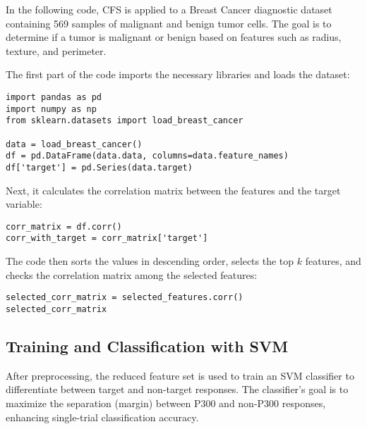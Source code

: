 \documentclass{article}
\begin{document}
In the following code, CFS is applied to a Breast Cancer diagnostic dataset containing 569 samples of malignant and benign tumor cells. The goal is to determine if a tumor is malignant or benign based on features such as radius, texture, and perimeter.

The first part of the code imports the necessary libraries and loads the dataset:
\begin{verbatim}
import pandas as pd
import numpy as np
from sklearn.datasets import load_breast_cancer

data = load_breast_cancer()
df = pd.DataFrame(data.data, columns=data.feature_names)
df['target'] = pd.Series(data.target)
\end{verbatim}

Next, it calculates the correlation matrix between the features and the target variable:
\begin{verbatim}
corr_matrix = df.corr()
corr_with_target = corr_matrix['target']
\end{verbatim}

The code then sorts the values in descending order, selects the top \( k \) features, and checks the correlation matrix among the selected features:
\begin{verbatim}
selected_corr_matrix = selected_features.corr()
selected_corr_matrix
\end{verbatim}


\subsection{Training and Classification with SVM}
After preprocessing, the reduced feature set is used to train an SVM classifier to differentiate between target and non-target responses. The classifier’s goal is to maximize the separation (margin) between P300 and non-P300 responses, enhancing single-trial classification accuracy.
\end{document}
